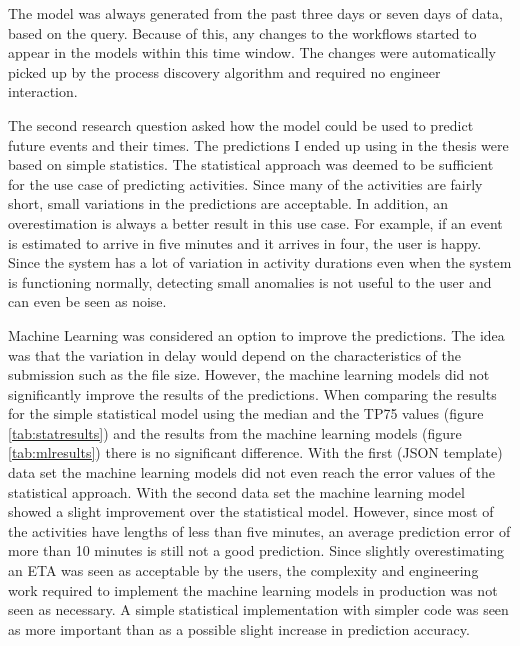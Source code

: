 The model was always generated from the past three days or seven days of data, based on the query. Because of this, any changes to the workflows started to appear in the models within this time window. 
The changes were automatically picked up by the process discovery algorithm and required no engineer interaction.

The second research question asked how the model could be used to predict future events and their times. 
The predictions I ended up using in the thesis were based on simple statistics. 
The statistical approach was deemed to be sufficient for the use case of predicting activities. 
Since many of the activities are fairly short, small variations in the predictions are acceptable. 
In addition, an overestimation is always a better result in this use case.
For example, if an event is estimated to arrive in five minutes and it arrives in four, the user is happy.
Since the system has a lot of variation in activity durations even when the system is functioning normally, detecting small anomalies is not useful to the user and can even be seen as noise.

Machine Learning was considered an option to improve the predictions. The idea was that the variation in delay would depend on the characteristics of the submission such as the file size.
However, the machine learning models did not significantly improve the results of the predictions.
When comparing the results for the simple statistical model using the median and the TP75 values (figure \ref{tab:statresults}) and the results from the machine learning models (figure \ref{tab:mlresults}) there is no significant difference.
With the first (JSON template) data set the machine learning models did not even reach the error values of the statistical approach.
With the second data set the machine learning model showed a slight improvement over the statistical model.
However, since most of the activities have lengths of less than five minutes, an average prediction error of more than 10 minutes is still not a good prediction.
Since slightly overestimating an ETA was seen as acceptable by the users, the complexity and engineering work required to implement the machine learning models in production was not seen as necessary.
A simple statistical implementation with simpler code was seen as more important than as a possible slight increase in prediction accuracy.

